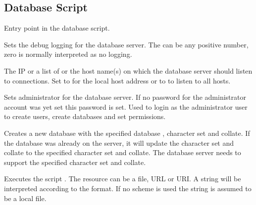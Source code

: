 \subsection{Database Script}



Entry point in the database script.


Sets the debug logging  for the database server. The 
can be any positive number, zero is normally interpreted as no logging.

\TheStatement*[database!bind]{bind [address: [local|all|\Arg{address}] [, addresses: \Arg{addresses}]}

The IP  or a list of  or the host name(s) 
on which the database server should listen to connections. Set to 
for the local host address  or to  to listen to all
hosts.


Sets administrator  for the database server. If no password for
the administrator account was yet set this password is set. Used to login as
the administrator user to create users, create databases and set permissions.


Creates a new database with the specified database , character set and collate.
If the database was already on the server, it will update the character set and collate
to the specified character set and collate. The database server needs to support 
the specified character set and collate.


Executes the script . The resource can be a file, URL or URI. 
A string will be interpreted according to the format. If no scheme is used 
the string is assumed to be a local file.

